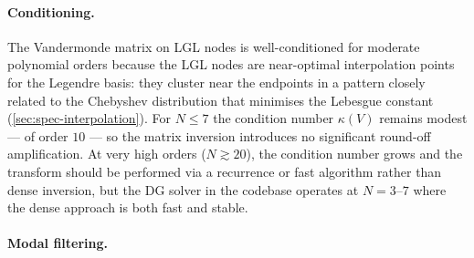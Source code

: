 \paragraph{Conditioning.}

The Vandermonde matrix on LGL nodes is well-conditioned for moderate
polynomial orders because the LGL nodes are near-optimal
interpolation points for the Legendre basis: they cluster near the
endpoints in a pattern closely related to the Chebyshev distribution
that minimises the Lebesgue constant
(\cref{sec:spec-interpolation}).  For $N \leq 7$ the condition number
$\kappa(V)$ remains modest --- of order $10$ --- so the matrix
inversion introduces no significant round-off amplification.  At very
high orders ($N \gtrsim 20$), the condition number grows and the
transform should be performed via a recurrence or fast algorithm
rather than dense inversion, but the DG solver in the codebase
operates at $N = 3$--$7$ where the dense approach is both fast and
stable.

\paragraph{Modal filtering.}

